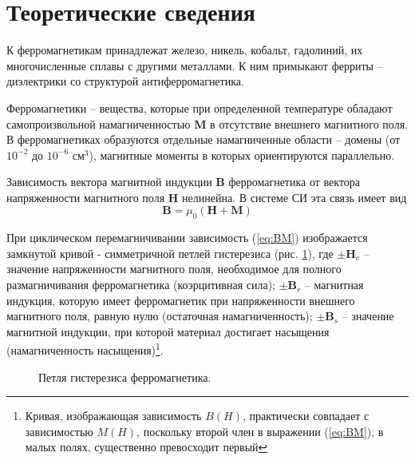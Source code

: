 \documentclass[a4paper,12pt]{article}
\begin{document}
\section{Теоретические сведения}

К ферромагнетикам принадлежат железо, никель, кобальт, гадолиний, их многочисленные сплавы с другими металлами. К ним примыкают ферриты -- диэлектрики со структурой антиферромагнетика.

Ферромагнетики -- вещества, которые при определенной температуре обладают самопроизвольной намагниченностью $\boldsymbol{M}$ в отсутствие внешнего магнитного поля. В ферромагнетиках образуются отдельные намагниченные области – домены (от $10^{-2}$ до $10^{-6}$ см$^3$), магнитные моменты в которых ориентируются параллельно.

Зависимость вектора магнитной индукции $\boldsymbol{B}$ ферромагнетика от вектора напряженности магнитного поля $\boldsymbol{H}$ нелинейна. В системе СИ эта связь имеет вид
\begin{equation} \label{eq:BM}
    \boldsymbol{B} = \mu_0(\boldsymbol{H} + \boldsymbol{M})
\end{equation}

При циклическом перемагничивании зависимость (\ref{eq:BM}) изображается замкнутой кривой - симметричной петлей гистерезиса (рис. \ref{ris:hysteresis}), где $\pm \boldsymbol{H}_c$ – значение напряженности магнитного поля, необходимое для полного размагничивания ферромагнетика (коэрцитивная сила); $\pm \boldsymbol{B}_r$ – магнитная индукция, которую имеет ферромагнетик при напряженности внешнего магнитного поля, равную нулю (остаточная намагниченность); $\pm \boldsymbol{B}_s$ – значение магнитной индукции, при которой материал достигает насыщения (намагниченность насыщения)\footnote{Кривая, изображающая зависимость $B(H)$, практически совпадает с зависимостью $M(H)$, поскольку второй член в выражении (\ref{eq:BM}), в малых полях, существенно превосходит первый}.
\begin{figure}[!h]
    \caption{Петля гистерезиса ферромагнетика.}
    \label{ris:hysteresis}
\end{figure}
\end{document}
